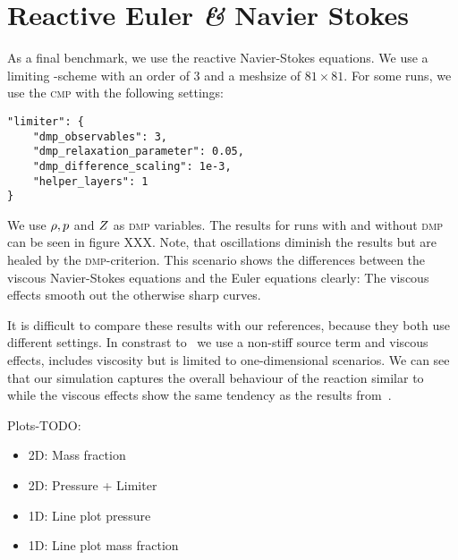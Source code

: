 \section{Reactive Euler \textit{\&} Navier Stokes}
As a final benchmark, we use the reactive Navier-Stokes equations.
We use a limiting \aderdg{}-scheme with an order of 3 and a meshsize of $81 \times 81$.
For some runs, we use the \textsc{cmp} with the following settings:
\begin{verbatim}
"limiter": {
    "dmp_observables": 3,
    "dmp_relaxation_parameter": 0.05,
    "dmp_difference_scaling": 1e-3,
    "helper_layers": 1
}
\end{verbatim}
We use $\rho, p$ and $Z$ as \textsc{dmp} variables.
The results for runs with and without \textsc{dmp} can be seen in figure XXX.
Note, that oscillations diminish the results but are healed by the \textsc{dmp}-criterion.
This scenario shows the differences between the viscous Navier-Stokes equations and the Euler equations clearly:
The viscous effects smooth out the otherwise sharp curves.

It is difficult to compare these results with our references, because they both use different settings.
In constrast to~\cite{helzel2000modified} we use a non-stiff source term and viscous effects, \cite{hidalgo2011ader} includes viscosity but is limited to one-dimensional scenarios.
We can see that our simulation captures the overall behaviour of the reaction similar to~\cite{helzel2000modified} while the viscous effects show the same tendency as the results from~\cite{hidalgo2011ader}.

Plots-TODO:
\begin{itemize}
\item 2D: Mass fraction
\item 2D: Pressure + Limiter
\item 1D: Line plot pressure
\item 1D: Line plot mass fraction
\end{itemize}

